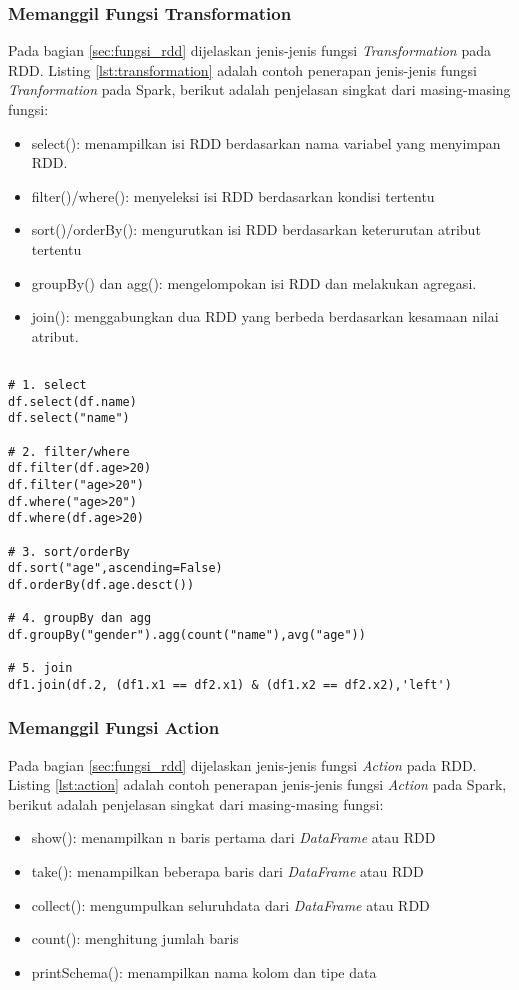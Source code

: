 \newpage
\subsubsection{Memanggil Fungsi Transformation}
\noindent Pada bagian \ref{sec:fungsi_rdd} dijelaskan jenis-jenis fungsi \textit{Transformation} pada RDD. Listing \ref{lst:transformation} adalah contoh penerapan jenis-jenis fungsi \textit{Tranformation} pada Spark, berikut adalah penjelasan singkat dari masing-masing fungsi:
\begin{itemize}
\item select(): menampilkan isi RDD berdasarkan nama variabel yang menyimpan RDD.
\item filter()/where(): menyeleksi isi RDD berdasarkan kondisi tertentu
\item sort()/orderBy(): mengurutkan isi RDD berdasarkan keterurutan atribut tertentu
\item groupBy() dan agg(): mengelompokan isi RDD dan melakukan agregasi.
\item join(): menggabungkan dua RDD yang berbeda berdasarkan kesamaan nilai atribut.
\end{itemize}

\begin{lstlisting}[basicstyle=\ttfamily, frame=single,
	columns=fullflexible, keepspaces=true, breaklines=true, label=lst:transformation, caption=Contoh Fungsi Transformation]
	
# 1. select
df.select(df.name)
df.select("name")

# 2. filter/where
df.filter(df.age>20)
df.filter("age>20")
df.where("age>20")
df.where(df.age>20)
 
# 3. sort/orderBy 
df.sort("age",ascending=False)
df.orderBy(df.age.desct())
 
# 4. groupBy dan agg
df.groupBy("gender").agg(count("name"),avg("age"))

# 5. join
df1.join(df.2, (df1.x1 == df2.x1) & (df1.x2 == df2.x2),'left')

\end{lstlisting}

\subsubsection{Memanggil Fungsi Action}
\noindent Pada bagian \ref{sec:fungsi_rdd} dijelaskan jenis-jenis fungsi \textit{Action} pada RDD. Listing \ref{lst:action} adalah contoh penerapan jenis-jenis fungsi \textit{Action} pada Spark, berikut adalah penjelasan singkat dari masing-masing fungsi:
\begin{itemize}
\item show(): menampilkan n baris pertama dari \textit{DataFrame} atau RDD
\item take(): menampilkan beberapa baris dari \textit{DataFrame} atau RDD
\item collect(): mengumpulkan seluruhdata dari \textit{DataFrame} atau RDD 
\item count(): menghitung jumlah baris
\item printSchema(): menampilkan nama kolom dan tipe data
\end{itemize}

